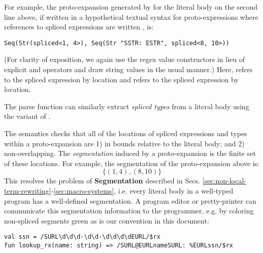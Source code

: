For example, the proto-expansion generated by  for the literal body on the second line above, if written in a hypothetical textual syntax for proto-expressions where references to spliced expressions are written , is:
\begin{lstlisting}[numbers=none]
Seq(Str(spliced<1, 4>), Seq(Str "SSTR: ESTR", spliced<8, 10>))
\end{lstlisting}
(For clarity of exposition, we again use the regex value constructors in lieu of explicit  and  operators and draw string values in the usual manner.) Here,  refers to the spliced expression  by location and  refers to the spliced expression  by location. 

The parse function can similarly extract \emph{spliced types} from a literal body using the  variant of . %


The semantics checks that all of the locations of spliced expressions and types within a proto-expansion are 1) in bounds relative to the literal body; and 2) non-overlapping. The \emph{segmentation} induced by a proto-expansion is the finite set of these locations. For example, the segmentation of the proto-expansion above is:
\[\{(1, 4), (8, 10)\}\]
This resolves the problem of \textbf{Segmentation} described in Secs. \ref{sec:non-local-term-rewriting}-\ref{sec:macro-systems}, i.e. every literal body in a well-typed program has a well-defined segmentation. A program editor or pretty-printer can communicate this segmentation information to the programmer, e.g. by coloring non-spliced segments green as is our convention in this document:
\begin{lstlisting}[numbers=none]
val ssn = /SURL\d\d\d-\d\d-\d\d\d\dEURL/$rx 
fun lookup_rx(name: string) => /SURL@EURLnameSURL: %EURLssn/$rx 
\end{lstlisting}

